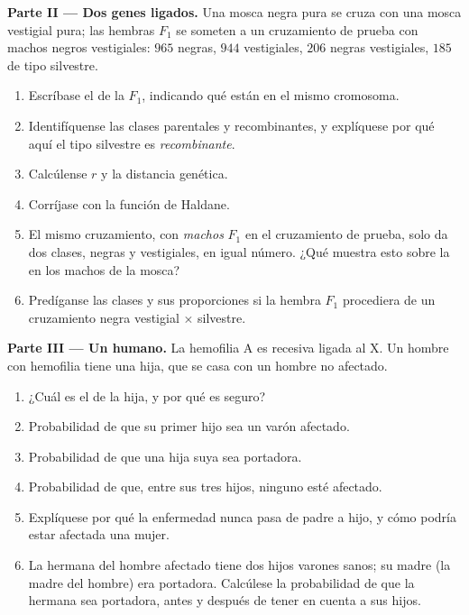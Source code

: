 \begin{problem}
\medskip
\noindent\textbf{Parte II --- Dos genes ligados.}
Una mosca negra pura se cruza con una mosca vestigial pura; las hembras
$F_1$ se someten a un cruzamiento de prueba con machos negros
vestigiales: $965$ negras,
$944$ vestigiales, $206$ negras vestigiales, $185$ de tipo silvestre.
\begin{enumerate}[resume]
  \item Escríbase el  de la $F_1$, indicando qué  están en
        el mismo cromosoma.
  \item Identifíquense las clases parentales y recombinantes, y
        explíquese por qué aquí el tipo silvestre es \emph{recombinante}.
  \item Calcúlense $r$ y la distancia genética.
  \item Corríjase con la función de Haldane.
  \item El mismo cruzamiento, con \emph{machos} $F_1$ en el cruzamiento de
        prueba, solo da dos clases, negras y vestigiales, en igual número.
        ¿Qué muestra esto sobre la  en los machos de la mosca?
  \item Predíganse las clases y sus proporciones si la hembra $F_1$
        procediera de un cruzamiento negra vestigial $\times$ silvestre.
\end{enumerate}

\medskip
\noindent\textbf{Parte III --- Un  humano.}
La hemofilia A es recesiva ligada al X. Un hombre con hemofilia tiene una
hija, que se casa con un hombre no afectado.
\begin{enumerate}[resume]
  \item ¿Cuál es el  de la hija, y por qué es seguro?
  \item Probabilidad de que su primer hijo sea un varón afectado.
  \item Probabilidad de que una hija suya sea portadora.
  \item Probabilidad de que, entre sus tres hijos, ninguno esté
        afectado.
  \item Explíquese por qué la enfermedad nunca pasa de padre a hijo, y
        cómo podría estar afectada una mujer.
  \item La hermana del hombre afectado tiene dos hijos varones sanos; su
        madre (la madre del hombre) era portadora. Calcúlese la
        probabilidad de que la hermana sea portadora, antes y después de
        tener en cuenta a sus hijos.
\end{enumerate}


\end{problem}
